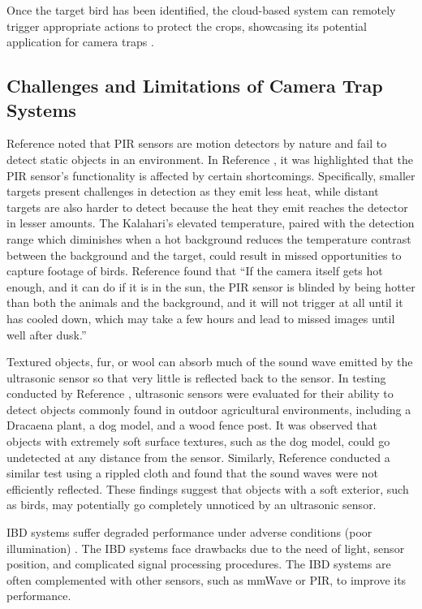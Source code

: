 \documentclass[class=report,11pt,crop=false]{standalone}
\begin{document}
Once the target bird has been identified, the cloud-based system can remotely trigger appropriate actions to protect the crops, showcasing its potential application for camera traps \cite{AcousticSensing}.

\subsection{Challenges and Limitations of Camera Trap Systems}
Reference \cite{ShutteredPIR} noted that \acrshort{PIR} sensors are motion detectors by nature and fail to detect static objects in an environment. In Reference \cite{HowCamersTrapsWork}, it was highlighted that the \acrshort{PIR} sensor's functionality is affected by certain shortcomings. Specifically, smaller targets present challenges in detection as they emit less heat, while distant targets are also harder to detect because the heat they emit reaches the detector in lesser amounts. The Kalahari’s elevated temperature, paired with the detection range which diminishes when a hot background reduces the temperature contrast between the background and the target, could result in missed opportunities to capture footage of birds. Reference \cite{HowCamersTrapsWork} found that “If the camera itself gets hot enough, and it can do if it is in the sun, the \acrshort{PIR} sensor is blinded by being hotter than both the animals and the background, and it will not trigger at all until it has cooled down, which may take a few hours and lead to missed images until well after dusk.”

Textured objects, fur, or wool can absorb much of the sound wave emitted by the ultrasonic sensor so that very little is reflected back to the sensor. In testing conducted by Reference \cite{UltrasonicAgri}, ultrasonic sensors were evaluated for their ability to detect objects commonly found in outdoor agricultural environments, including a Dracaena plant, a dog model, and a wood fence post. It was observed that objects with extremely soft surface textures, such as the dog model, could go undetected at any distance from the sensor. Similarly, Reference \cite{UltrasonicObjectDetect} conducted a similar test using a rippled cloth and found that the sound waves were not efficiently reflected. These findings suggest that objects with a soft exterior, such as birds, may potentially go completely unnoticed by an ultrasonic sensor.

\acrfull{IBD} systems suffer degraded performance under adverse conditions (poor illumination) \cite{mmWave4}. The \acrshort{IBD} systems face drawbacks due to the need of light, sensor position, and complicated signal processing procedures. The \acrshort{IBD} systems are often complemented with other sensors, such as \acrshort{mmWave} or \acrshort{PIR}, to improve its performance.
\end{document}
